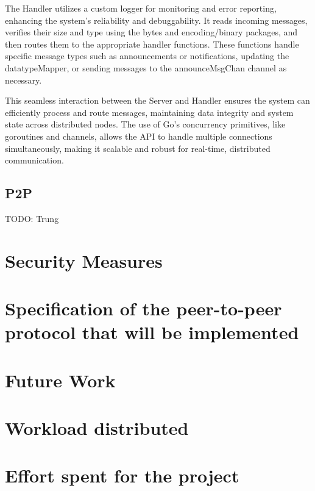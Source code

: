 The Handler utilizes a custom logger for monitoring and error reporting, enhancing the system's reliability and debuggability. It reads incoming messages, verifies their size and type using the bytes and encoding/binary packages, and then routes them to the appropriate handler functions. These functions handle specific message types such as announcements or notifications, updating the datatypeMapper, or sending messages to the announceMsgChan channel as necessary.

This seamless interaction between the Server and Handler ensures the system can efficiently process and route messages, maintaining data integrity and system state across distributed nodes. The use of Go's concurrency primitives, like goroutines and channels, allows the API to handle multiple connections simultaneously, making it scalable and robust for real-time, distributed communication.


\subsection{P2P}

TODO: Trung

\section{Security Measures}

\section{Specification of the peer-to-peer protocol that will be implemented}

\section{Future Work}

\section{Workload distributed}

\section{Effort spent for the project}